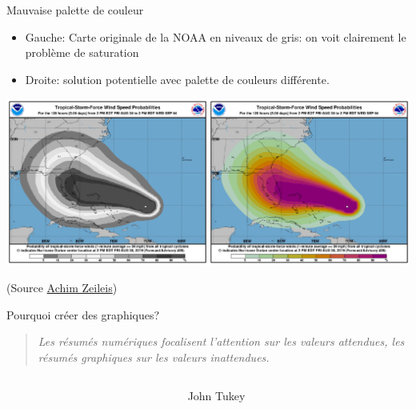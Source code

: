 \documentclass[
  ignorenonframetext,
]{beamer}
\begin{document}
\begin{frame}{Mauvaise palette de couleur}
\protect\hypertarget{mauvaise-palette-de-couleur}{}
\begin{itemize}
\item
  Gauche: Carte originale de la NOAA en niveaux de gris: on voit
  clairement le problème de saturation
\item
  Droite: solution potentielle avec palette de couleurs différente.
\end{itemize}

\includegraphics{MATH60602-diapos1_files/figure-beamer/unnamed-chunk-10-1.pdf}

(Source \href{https://www.zeileis.org/news/dorian_rainbow/}{Achim
Zeileis})
\end{frame}

\begin{frame}{Pourquoi créer des graphiques?}
\protect\hypertarget{pourquoi-cruxe9er-des-graphiques}{}
\begin{quote}
\emph{Les résumés numériques focalisent l'attention sur les valeurs
attendues, les résumés graphiques sur les valeurs inattendues.}
\end{quote}

\begin{columns}[T]
\begin{column}{0.8\textwidth}
\end{column}

\begin{column}{0.2\textwidth}
John Tukey
\end{column}
\end{columns}
\end{frame}
\end{document}
